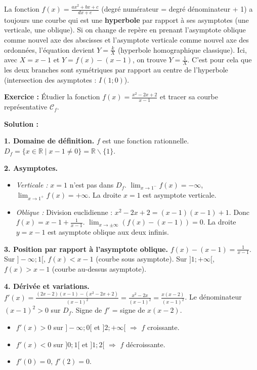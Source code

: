 \documentclass[11pt]{article}
\def\setminus{\mathbin{\backslash}}\let\smallsetminus\setminus
\begin{document}
\begin{savaistu}
La fonction $f(x) = \frac{ax^2+bx+c}{dx+e}$ (degré numérateur = degré dénominateur + 1) a toujours une courbe qui est une \textbf{hyperbole} par rapport à ses asymptotes (une verticale, une oblique).
Si on change de repère en prenant l'asymptote oblique comme nouvel axe des abscisses et l'asymptote verticale comme nouvel axe des ordonnées, l'équation devient $Y = \frac{k}{X}$ (hyperbole homographique classique). Ici, avec $X = x-1$ et $Y = f(x) - (x-1)$, on trouve $Y = \frac{1}{X}$. C'est pour cela que les deux branches sont symétriques par rapport au centre de l'hyperbole (intersection des asymptotes : $I(1;0)$).
\end{savaistu}

\begin{exemplebox}
\textbf{Exercice :} Étudier la fonction $f(x) = \frac{x^2 - 2x + 2}{x - 1}$ et tracer sa courbe représentative $\mathcal{C}_f$.

\textbf{Solution :}

\noindent\textbf{1. Domaine de définition.} $f$ est une fonction rationnelle. $D_f = \{ x \in \mathbb{R} \mid x - 1 \neq 0 \} = \mathbb{R} \setminus \{1\}$.

\noindent\textbf{2. Asymptotes.}
\begin{itemize}
    \item \textit{Verticale :} $x=1$ n'est pas dans $D_f$. $\lim_{x\to 1^-} f(x) = -\infty$, $\lim_{x\to 1^+} f(x) = +\infty$. La droite $x=1$ est asymptote verticale.
    \item \textit{Oblique :} Division euclidienne : $x^2-2x+2 = (x-1)(x-1) + 1$. Donc $f(x) = x-1 + \frac{1}{x-1}$.
    $\lim_{x\to\pm\infty} (f(x) - (x-1)) = 0$. La droite $y = x-1$ est asymptote oblique aux deux infinis.
\end{itemize}

\noindent\textbf{3. Position par rapport à l'asymptote oblique.}
$f(x) - (x-1) = \frac{1}{x-1}$.
Sur $]-\infty;1[$, $f(x) < x-1$ (courbe sous asymptote).
Sur $]1;+\infty[$, $f(x) > x-1$ (courbe au-dessus asymptote).

\noindent\textbf{4. Dérivée et variations.}
$f'(x) = \frac{(2x-2)(x-1) - (x^2-2x+2)}{(x-1)^2} = \frac{x^2-2x}{(x-1)^2} = \frac{x(x-2)}{(x-1)^2}$.
Le dénominateur $(x-1)^2 > 0$ sur $D_f$. Signe de $f'$ = signe de $x(x-2)$.
\begin{itemize}
    \item $f'(x) > 0$ sur $]-\infty;0[$ et $]2;+\infty[$ $\Rightarrow$ $f$ croissante.
    \item $f'(x) < 0$ sur $]0;1[$ et $]1;2[$ $\Rightarrow$ $f$ décroissante.
    \item $f'(0)=0$, $f'(2)=0$.
\end{itemize}


\end{exemplebox}
\end{document}

